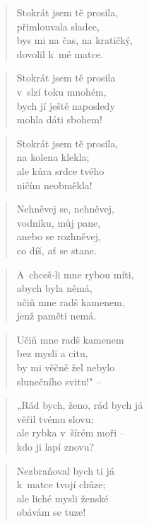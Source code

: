 \begin{verse}
Stokrát jsem tě prosila, \\
přimlouvala sladce, \\
bys mi na čas, na kratičký, \\
dovolil k~mé matce.
\end{verse}

\begin{verse}
Stokrát jsem tě prosila \\
v~slzí toku mnohém, \\
bych jí ještě naposledy \\
mohla dáti sbohem!
\end{verse}

\begin{verse}
Stokrát jsem tě prosila, \\
na kolena klekla; \\
ale kůra srdce tvého \\
ničím neobměkla!
\end{verse}

\begin{verse}
Nehněvej se, nehněvej, \\
vodníku, můj pane, \\
anebo se rozhněvej, \\
co díš, ať se stane.
\end{verse}

\begin{verse}
A~chceš-li mne rybou míti, \\
abych byla němá, \\
učiň mne radš kamenem, \\
jenž paměti nemá.
\end{verse}

\begin{verse}
Učiň mne radš kamenem \\
bez mysli a citu, \\
by mi věčně žel nebylo \\
slunečního svitu!" --
\end{verse}

\begin{verse}
„Rád bych, ženo, rád bych já \\
věřil tvému slovu; \\
ale rybka v~šírém moři -- \\
kdo ji lapí znovu?
\end{verse}

\begin{verse}
Nezbraňoval bych ti já \\
k~matce tvojí chůze; \\
ale liché mysli ženské \\
obávám se tuze!
\end{verse}

